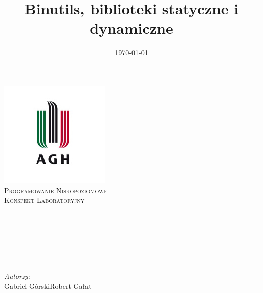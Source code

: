 \documentclass[12pt]{article}
\title{Binutils, biblioteki statyczne i dynamiczne} %
\author{} %
\date{\today} %
\begin{document}

\begin{titlepage}
	\centering \vspace*{0.5 cm} \includegraphics[scale = 0.75]{agh.jpg}\\[1.0
  cm] %
	\textsc{\Large Programowanie Niskopoziomowe}\\[0.5 cm] %
	\textsc{\large Konspekt Laboratoryjny}\\[0.5 cm] %
	\rule{\linewidth}{0.2 mm} \\[0.4 cm]
	{ \huge \bfseries \thetitle}\\
	\rule{\linewidth}{0.2 mm} \\[1.5 cm]
	
	\begin{minipage}{0.4\textwidth}
		\begin{flushleft} \large \vspace{3cm}
			\emph{Autorzy:}\\
			Gabriel Górski\newline Robert Gałat %
    \end{flushleft}
  \end{minipage}~
  \begin{minipage}{0.4\textwidth}
    \begin{flushright} \large
		\end{flushright}
	\end{minipage}\\[2 cm]
	
	{\large \thedate}\\[2 cm]
 
	\vfill
	
\end{titlepage}

\end{document}
